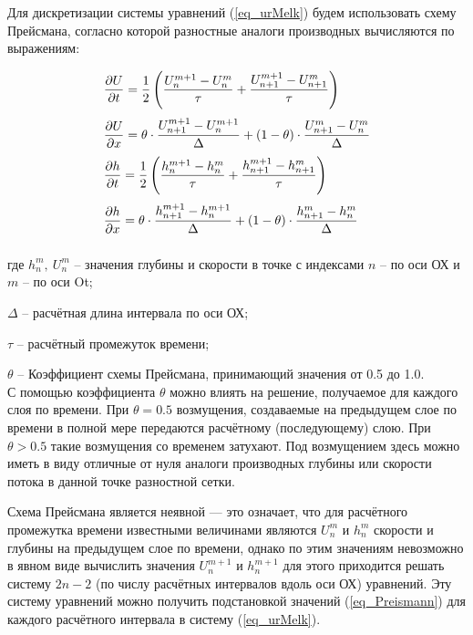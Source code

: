 Для дискретизации системы уравнений (\ref{eq_urMelk}) будем использовать схему Прейсмана, согласно которой разностные аналоги производных вычисляются по выражениям:

\begin{equation}
   \label{eq_Preismann}
   \begin{array}{ll}
      \vspace{7pt}
      \displaystyle \frac{\partial U}{\partial t} = \frac{1}{2} \left( \frac{U_n^{m+1}- U_n^m}{\tau} + \frac{U_{n+1}^{m+1}- U_{n+1}^m}{\tau}\right)  \\
      \vspace{7pt}
      \displaystyle \frac{\partial U}{\partial x} = \theta \cdot \frac{U_{n+1}^{m+1} - U_n^{m+1}} {\Delta} + (1-\theta) \cdot \frac{U_{n+1}^m- U_n^m }{\Delta} \\
      \vspace{7pt}
      \displaystyle \frac{\partial h}{\partial t} = \frac{1}{2} \left( \frac{h_n^{m+1}- h_n^m}{\tau} + \frac{h_{n+1}^{m+1}- h_{n+1}^m}{\tau}\right)  \\
      \vspace{7pt}
      \displaystyle \frac{\partial h}{\partial x} = \theta \cdot \frac{h_{n+1}^{m+1} - h_n^{m+1}} {\Delta} + (1-\theta) \cdot \frac{h_{n+1}^m- h_n^m }{\Delta}
   \end{array} 
\end{equation}

\noindent где $ h_n^m, \ U_n^m $ -- значения глубины и скорости в точке с индексами $ n $ -- по оси ОХ и $ m $ -- по оси Ot;

$ \Delta $ -- расчётная длина интервала по оси ОХ; 

$ \tau $ -- расчётный промежуток времени; 

$ \theta $ -- Коэффициент схемы Прейсмана, принимающий значения от 0.5 до 1.0. \\


С помощью коэффициента $ \theta $ можно влиять на решение, получаемое для каждого слоя по времени. При $ \theta = 0.5 $ возмущения, создаваемые на предыдущем слое по времени в полной мере передаются расчётному (последующему) слою. При $ \theta > 0.5 $ такие возмущения со временем затухают. Под возмущением здесь можно иметь в виду отличные от нуля аналоги производных глубины или скорости потока в данной точке разностной сетки.

Схема Прейсмана является неявной --- это означает, что для расчётного промежутка времени известными величинами являются $ U_n^m $ и $ h_n^m $ скорости и глубины на предыдущем слое по времени, однако по этим значениям невозможно в явном виде вычислить значения $ U_n^{m+1} $ и $ h_n^{m+1} $ для этого приходится решать систему $ 2n - 2 $ (по числу расчётных интервалов вдоль оси ОХ) уравнений. Эту систему уравнений можно получить подстановкой значений (\ref{eq_Preismann}) для каждого расчётного интервала в систему (\ref{eq_urMelk}).

